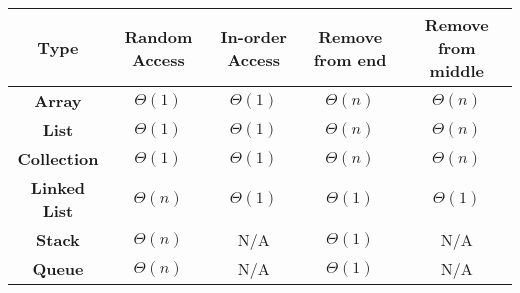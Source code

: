 \documentclass[12pt,american]{article}
\providecommand{\tabularnewline}{\\}
\providecommand{\tabularnewline}{\\}
\begin{document}
\begin{center}
{\small{}\smallskip{}
}{\small\par}
\par\end{center}

\begin{center}
\begin{tabular}{|c|c|c|c|c|}
\hline 
\textbf{\small{}Type} & \textbf{\small{}Random Access} & \textbf{\small{}In-order Access} & \textbf{\small{}Remove from end} & \textbf{\small{}Remove from middle}\tabularnewline
\hline 
\hline 
\textbf{\small{}Array} & {\small{}$\Theta(1)$} & {\small{}$\Theta(1)$} & {\small{}$\Theta(n)$} & {\small{}$\Theta(n)$}\tabularnewline
\hline 
\textbf{\small{}List} & {\small{}$\Theta(1)$} & {\small{}$\Theta(1)$} & {\small{}$\Theta(n)$} & {\small{}$\Theta(n)$}\tabularnewline
\hline 
\textbf{\small{}Collection} & {\small{}$\Theta(1)$} & {\small{}$\Theta(1)$} & {\small{}$\Theta(n)$} & {\small{}$\Theta(n)$}\tabularnewline
\hline 
\textbf{\small{}Linked List} & {\small{}$\Theta(n)$} & {\small{}$\Theta(1)$} & {\small{}$\Theta(1)$} & {\small{}$\Theta(1)$}\tabularnewline
\hline 
\textbf{\small{}Stack} & {\small{}$\Theta(n)$} & {\small{}N/A}  & {\small{}$\Theta(1)$} & {\small{}N/A}\tabularnewline
\hline 
\textbf{\small{}Queue} & {\small{}$\Theta(n)$} & {\small{}N/A } & {\small{}$\Theta(1)$} & {\small{}N/A}\tabularnewline
\hline 
\end{tabular}
\par\end{center}

\begin{center}
\vfill{}
\par\end{center}
\end{document}
